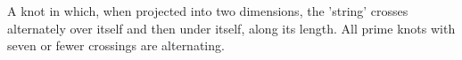 A knot in which, when projected into two dimensions, the 'string' crosses
alternately over itself and then under itself, along its length.
All prime knots with seven or fewer crossings are alternating.